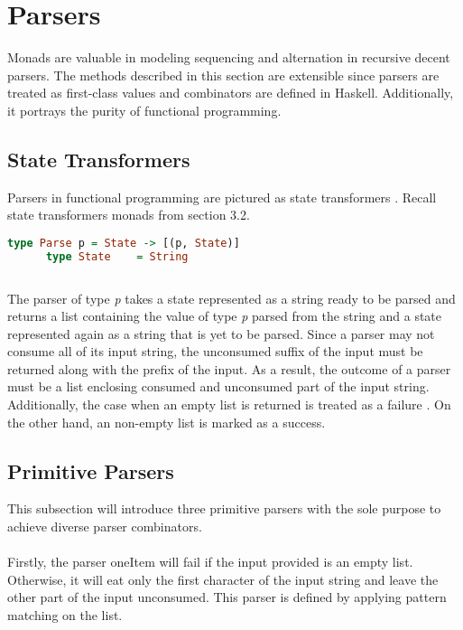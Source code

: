\documentclass[a4paper, onecolumn]{article}
\begin{document}
    
    
    \section{Parsers}
    Monads are valuable in modeling sequencing and alternation in recursive decent parsers. The methods described in this section are extensible since parsers are treated as first-class values and combinators are defined in Haskell. Additionally, it portrays the purity of functional programming.
    
    \subsection{State Transformers}
    
    Parsers in functional programming are pictured as state transformers \cite{original}. Recall state transformers monads from section 3.2.  
    
    \begin{tcolorbox}
      \begin{lstlisting}[language=Haskell]
      type Parse p = State -> [(p, State)]
      type State    = String  
      
      \end{lstlisting}
    \end{tcolorbox}
    
    The parser of type \textit{p} takes a state represented as a string ready to be parsed and returns a list containing the value of type \textit{p} parsed from the string and a state represented again as a string that is yet to be parsed. Since a parser may not consume all of its input string, the unconsumed suffix of the input must be returned along with the prefix of the input. As a result, the outcome of a parser must be a list enclosing consumed and unconsumed part of the input string. Additionally, the case when an empty list is returned is treated as a failure \cite{pearls}. On the other hand, an non-empty list is marked as a success.
    
    \subsection{Primitive Parsers}
    
    This subsection will introduce three primitive parsers with the sole purpose to achieve diverse parser combinators. \\ \\
    Firstly, the parser oneItem will fail if the input provided is an empty list. Otherwise, it will eat only the first character of the input string and leave the other part of the input unconsumed. This parser is defined by applying pattern matching on the list. 
     
\end{document}
